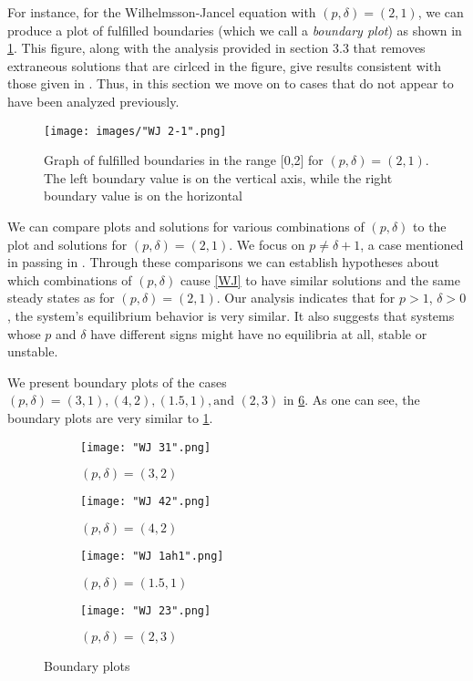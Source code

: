 \documentclass[11pt]{article}
\begin{document}
For instance, for the Wilhelmsson-Jancel equation with $(p, \delta) = (2,1)$, we can produce a plot of fulfilled boundaries (which we call a \textit{boundary plot}) as shown in \cref{21plot}. This figure, along with the analysis provided in section 3.3 that removes extraneous solutions that are cirlced in the figure, give results consistent with those given in \citep{WJ}. Thus, in this section we move on to cases that do not appear to have been analyzed previously.

\begin{figure}[h]
\begin{center}
\texttt{[image: images/"WJ 2-1".png]}
\caption{Graph of fulfilled boundaries in the range [0,2] for $(p, \delta) = (2,1)$. The left boundary value is on the vertical axis, while the right boundary value is on the horizontal}
\label{21plot}
\end{center}
\end{figure}

We can compare plots and solutions for various combinations of $(p, \delta)$ to the plot and solutions for $(p, \delta) = (2,1)$. We focus on $p \ne \delta + 1$, a case mentioned in passing in \citep{WJ}. Through these comparisons we can establish hypotheses about which combinations of $(p, \delta)$ cause \cref{WJ} to have similar solutions and the same steady states as for $(p, \delta) = (2,1)$. Our analysis indicates that for $p > 1$, $\delta > 0$, the system's equilibrium behavior is very similar. It also suggests that systems whose $p$ and $\delta$ have different signs might have no equilibria at all, stable or unstable. 

We present boundary plots of the cases $(p, \delta) = (3,1), (4, 2), (1.5, 1), \text{and } (2,3)$ in \cref{large_positive_plot}. As one can see, the boundary plots are very similar to \cref{21plot}.

\begin{figure}[h]
\begin{subfigure}{.25\textwidth}
  \centering
  \texttt{[image: "WJ 31".png]}
  \caption{$(p, \delta) = (3,2)$}
  \label{31plot}
\end{subfigure}%
\begin{subfigure}{.25\textwidth}
  \centering
  \texttt{[image: "WJ 42".png]}
  \caption{$(p, \delta) = (4,2)$}
  \label{42plot}
\end{subfigure}%
\begin{subfigure}{.25\textwidth}
  \centering
  \texttt{[image: "WJ 1ah1".png]}
  \caption{$(p, \delta) = (1.5,1)$}
  \label{1ah1plot}
\end{subfigure}%
\begin{subfigure}{.25\textwidth}
  \centering
  \texttt{[image: "WJ 23".png]}
  \caption{$(p, \delta) = (2,3)$}
  \label{23plot}
\end{subfigure}
\caption{Boundary plots}
\label{large_positive_plot}
\end{figure}
\end{document}
